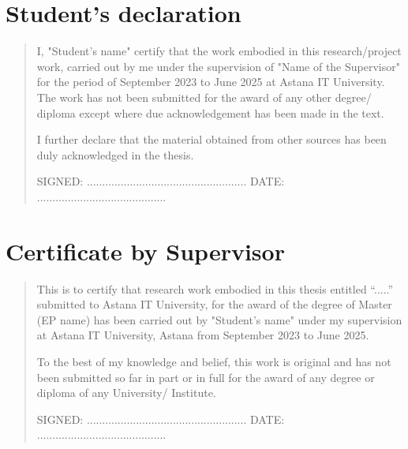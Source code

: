 %
%
\chapter{Student's declaration}
\begin{SingleSpace}
\begin{quote}
I, "Student's name" certify that the work embodied in this research/project work, carried out by me under the supervision of "Name of the Supervisor" for the period of September 2023 to June 2025 at  Astana IT University.  The work has not been submitted for the award of any other degree/ diploma except where due acknowledgement has been made in the text.

I further declare that the material obtained from other sources has been duly acknowledged in the thesis.

\vspace{1.5cm}
\noindent
\hspace{-0.75cm}\textsc{SIGNED: .................................................... DATE: ..........................................}

\end{quote}
\end{SingleSpace}
\chapter{Certificate by Supervisor}
\begin{SingleSpace}
\begin{quote}
This is to certify that research work embodied in this thesis entitled “.....” submitted to Astana IT University, for the award of the degree of Master (EP name) has been carried out by "Student's name" under my supervision at Astana IT University, Astana from September 2023 to June 2025.

To the best of my knowledge and belief, this work is original and has not been submitted so far in part or in full for the award of any degree or diploma of any University/ Institute.

\vspace{1.5cm}
\noindent
\hspace{-0.75cm}\textsc{SIGNED: .................................................... DATE: ..........................................}

\end{quote}
\end{SingleSpace}
\clearpage
